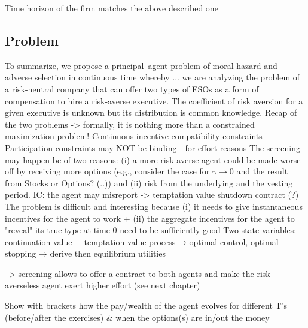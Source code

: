 Time horizon of the firm matches the above described one



\subsection{Problem}
To summarize, we propose a principal–agent problem of moral hazard and adverse selection in continuous time whereby ... we are analyzing the problem of a risk-neutral company that can offer two types of ESOs as a form of compensation to hire a risk-averse executive. The coefficient of risk aversion for a given executive is unknown but its distribution is common knowledge.
Recap of the two problems
-> formally, it is nothing more than a constrained maximization problem!
Continuous incentive compatibility constraints
Participation constraints may NOT be binding - for effort reasons
The screening may happen bc of two reasons: (i) a more risk-averse agent could be made worse off by receiving more options (e.g., consider the case for $\gamma \rightarrow 0$ and the result from Stocks or Options? (..)) and (ii) risk from the underlying and the vesting period.
IC: the agent may misreport -> temptation value
shutdown contract (?)
The problem is difficult and interesting because (i) it needs to give instantaneous incentives for the agent to work + (ii) the aggregate incentives for the agent to "reveal" its true type at time 0 need to be sufficiently good
Two state variables: continuation value + temptation-value process
→ optimal control, optimal stopping → derive then equilibrium utilities

--> screening allows to offer a contract to both agents and make the risk-averseless agent exert higher effort (see next chapter)

Show with brackets how the pay/wealth of the agent evolves for different T's (before/after the exercises) \& when the options(s) are in/out the money





